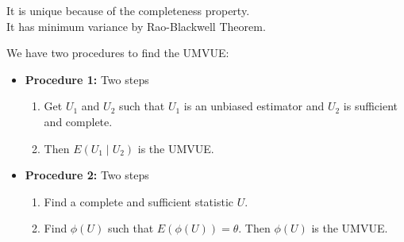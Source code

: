 \documentclass[a4paper,12pt]{article}
\theoremstyle{nonitalic}
\begin{document}
    \bigskip

    It is unique because of the completeness property.\\
    It has minimum variance by Rao-Blackwell Theorem.

    \bigskip

    We have two procedures to find the UMVUE:

    \begin{itemize}
        \item \textbf{Procedure 1:} Two steps
        \begin{enumerate}
            \item Get \(U_1\) and \(U_2\) such that \(U_1\) is an unbiased estimator and \(U_2\) is sufficient and complete.
            \item Then \(E(U_1 \mid U_2)\) is the UMVUE.
        \end{enumerate}
        
        \item \textbf{Procedure 2:} Two steps
        \begin{enumerate}
            \item Find a complete and sufficient statistic \(U\).
            \item Find \(\phi(U)\) such that \(E(\phi(U)) = \theta\). Then \(\phi(U)\) is the UMVUE.
        \end{enumerate}
    \end{itemize}











\end{document}
